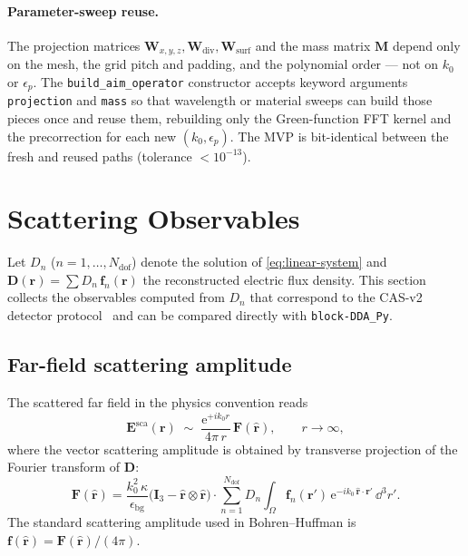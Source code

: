 \documentclass[11pt,a4paper]{article}
\begin{document}
\paragraph{Parameter-sweep reuse.}
The projection matrices $\mathbf{W}_{x,y,z},
\mathbf{W}_{\text{div}},\mathbf{W}_{\text{surf}}$ and the mass
matrix $\mathbf{M}$ depend only on the mesh, the grid pitch and
padding, and the polynomial order --- not on $k_0$ or $\epsilon_p$.
The \texttt{build\_aim\_operator} constructor accepts keyword
arguments \texttt{projection} and \texttt{mass} so that wavelength
or material sweeps can build those pieces once and reuse them,
rebuilding only the Green-function FFT kernel and the precorrection
for each new $(k_0,\epsilon_p)$. The MVP is bit-identical between
the fresh and reused paths (tolerance $< 10^{-13}$).

\section{Scattering Observables}
\label{sec:observables}

Let $D_n$ ($n = 1,\ldots,N_{\text{dof}}$) denote the solution of
\eqref{eq:linear-system} and $\bm{D}(\bm{r}) = \sum D_n\,\bm{f}_n(\bm{r})$
the reconstructed electric flux density. This section collects the
observables computed from $D_n$ that correspond to the CAS-v2 detector
protocol~\cite{Moteki2024} and can be compared directly with
\texttt{block-DDA\_Py}.

\subsection{Far-field scattering amplitude}
\label{sec:far-field}

The scattered far field in the physics convention reads
\begin{equation}
  \bm{E}^{\text{sca}}(\bm{r}) \;\sim\;
    \frac{\mathrm{e}^{+i k_0 r}}{4\pi\,r}\,\bm{F}(\hat{\bm{r}}),
  \qquad r\to\infty,
  \label{eq:far-field}
\end{equation}
where the vector scattering amplitude is obtained by transverse
projection of the Fourier transform of $\bm{D}$:
\begin{equation}
  \bm{F}(\hat{\bm{r}})
    = \frac{k_0^{2}\,\kappa}{\epsilon_{\text{bg}}}
      \bigl(\mathbf{I}_3 - \hat{\bm{r}}\otimes\hat{\bm{r}}\bigr)\cdot
      \sum_{n=1}^{N_{\text{dof}}} D_n
      \int_{\Omega}\bm{f}_n(\bm{r}')\,
                    \mathrm{e}^{-i k_0\,\hat{\bm{r}}\cdot\bm{r}'}\,
      \dd^{3}r'.
  \label{eq:F-viem}
\end{equation}
The standard scattering amplitude used in Bohren--Huffman
\cite{Bohren1983} is $\bm{f}(\hat{\bm{r}}) = \bm{F}(\hat{\bm{r}})/(4\pi)$.
\end{document}

